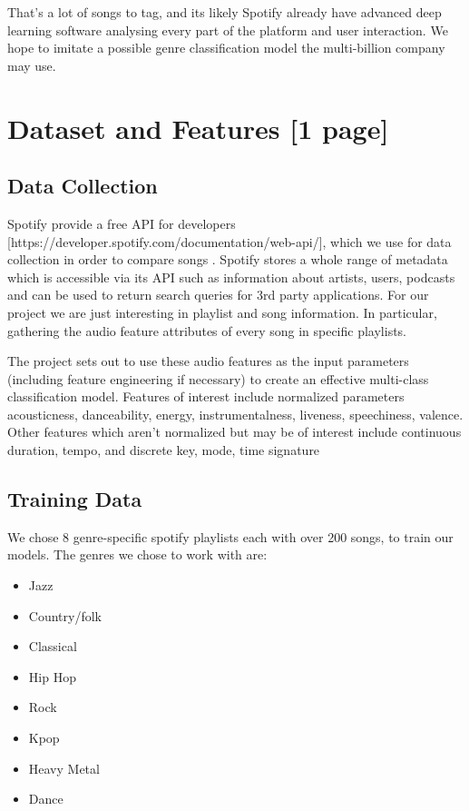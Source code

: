 \documentclass[12pt, a4]{article} %
\begin{document}
That's a lot of songs to tag, and its likely Spotify already have advanced deep learning software analysing every part of the platform and user interaction. We hope to imitate a possible genre classification model the multi-billion company may use.


\section{Dataset and Features [1 page]}
\subsection{Data Collection}

Spotify provide a free API for developers [https://developer.spotify.com/documentation/web-api/], which we use for data collection in order to compare songs . Spotify stores a whole range of metadata which is accessible via its API such as information about artists, users, podcasts and can be used to return search queries for 3rd party applications. For our project we are just interesting in playlist and song information. In particular, gathering the audio feature attributes of every song in specific playlists.

The project sets out to use these audio features as the input parameters (including feature engineering if necessary) to create an effective multi-class classification model. Features of interest include normalized parameters {acousticness, danceability, energy, instrumentalness, liveness, speechiness, valence}. Other features which aren't normalized but may be of interest include continuous {duration, tempo}, and discrete { key, mode, time signature}


\subsection{Training Data}
We chose 8 genre-specific spotify playlists each with over 200 songs, to train our models. The genres we chose to work with are:
\begin{itemize}
\item Jazz
\item Country/folk
\item Classical
\item Hip Hop
\item Rock
\item Kpop
\item Heavy Metal
\item Dance
\end{itemize}
\end{document}
